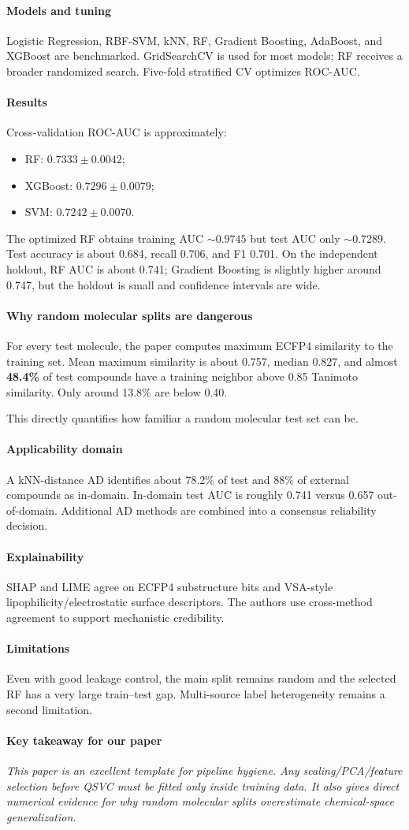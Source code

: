 \documentclass[11pt]{article}
\newcommand{\reviewfield}[2]{\paragraph{#1}#2}
\newcommand{\keytakeaway}[1]{\paragraph{Key takeaway for our paper}\emph{#1}}
\begin{document}
\reviewfield{Models and tuning}{
Logistic Regression, RBF-SVM, kNN, RF, Gradient Boosting, AdaBoost, and XGBoost are benchmarked. GridSearchCV is used for most models; RF receives a broader randomized search. Five-fold stratified CV optimizes ROC-AUC.
}

\reviewfield{Results}{
Cross-validation ROC-AUC is approximately:
\begin{itemize}
    \item RF: $0.7333\pm0.0042$;
    \item XGBoost: $0.7296\pm0.0079$;
    \item SVM: $0.7242\pm0.0070$.
\end{itemize}

The optimized RF obtains training AUC $\sim0.9745$ but test AUC only $\sim0.7289$. Test accuracy is about 0.684, recall 0.706, and F1 0.701. On the independent holdout, RF AUC is about 0.741; Gradient Boosting is slightly higher around 0.747, but the holdout is small and confidence intervals are wide.
}

\reviewfield{Why random molecular splits are dangerous}{
For every test molecule, the paper computes maximum ECFP4 similarity to the training set. Mean maximum similarity is about 0.757, median 0.827, and almost \textbf{48.4\%} of test compounds have a training neighbor above 0.85 Tanimoto similarity. Only around 13.8\% are below 0.40.

This directly quantifies how familiar a random molecular test set can be.
}

\reviewfield{Applicability domain}{
A kNN-distance AD identifies about 78.2\% of test and 88\% of external compounds as in-domain. In-domain test AUC is roughly 0.741 versus 0.657 out-of-domain. Additional AD methods are combined into a consensus reliability decision.
}

\reviewfield{Explainability}{
SHAP and LIME agree on ECFP4 substructure bits and VSA-style lipophilicity/electrostatic surface descriptors. The authors use cross-method agreement to support mechanistic credibility.
}

\reviewfield{Limitations}{
Even with good leakage control, the main split remains random and the selected RF has a very large train--test gap. Multi-source label heterogeneity remains a second limitation.
}

\keytakeaway{This paper is an excellent template for pipeline hygiene. Any scaling/PCA/feature selection before QSVC must be fitted only inside training data. It also gives direct numerical evidence for why random molecular splits overestimate chemical-space generalization.}
\end{document}
